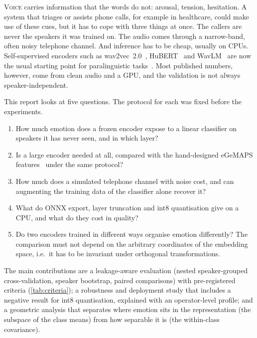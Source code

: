 \documentclass[11pt,a4paper]{article}
\begin{document}
\lettrine[lines=2,findent=2pt,nindent=0pt]{\color{seriesA}V}{oice} carries information that the
words do not: arousal, tension, hesitation. A system that triages or assists phone calls, for
example in healthcare, could make use of these cues, but it has to cope with three things at
once. The callers are never the speakers it was trained on. The audio comes through a
narrow-band, often noisy telephone channel. And inference has to be cheap, usually on CPUs.
Self-supervised encoders such as wav2vec~2.0~\citep{baevski2020wav2vec},
HuBERT~\citep{hsu2021hubert} and WavLM~\citep{chen2022wavlm} are now the usual starting point
for paralinguistic tasks~\citep{yang2021superb,wagner2023dawn}. Most published numbers, however,
come from clean audio and a GPU, and the validation is not always speaker-independent.

This report looks at five questions. The protocol for each was fixed before the experiments.
\begin{enumerate}[label=\textbf{Q\arabic*},leftmargin=2.2em]
  \item How much emotion does a frozen encoder expose to a linear classifier on speakers it has
        never seen, and in which layer?
  \item Is a large encoder needed at all, compared with the hand-designed eGeMAPS
        features~\citep{eyben2016gemaps} under the same protocol?
  \item How much does a simulated telephone channel with noise cost, and can augmenting the
        training data of the classifier alone recover it?
  \item What do ONNX export, layer truncation and int8 quantisation give on a CPU, and what do
        they cost in quality?
  \item Do two encoders trained in different ways organise emotion differently? The comparison
        must not depend on the arbitrary coordinates of the embedding space, i.e.\ it has to be
        invariant under orthogonal transformations.
\end{enumerate}

The main contributions are a leakage-aware evaluation (nested speaker-grouped cross-validation,
speaker bootstrap, paired comparisons) with pre-registered criteria (\cref{tab:criteria}); a
robustness and deployment study that includes a negative result for int8 quantisation,
explained with an operator-level profile; and a geometric analysis that separates where emotion
sits in the representation (the subspace of the class means) from how separable it is (the
within-class covariance).
\end{document}
